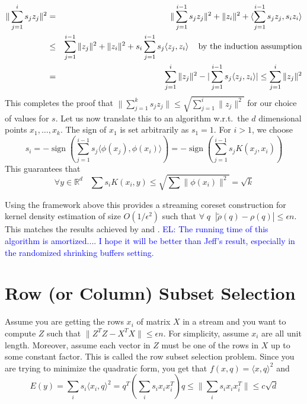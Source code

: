 \documentclass{article} %
\newcommand{\el}[1]{\textcolor{blue}{EL: #1}}
\newcommand{\R}{\mathbb{R}}
\newcommand{\eps}{\epsilon}
\begin{document}
\begin{eqnarray*}
\| \sum_{j=1}^{i}s_j z_j\|^2 &=& \|\sum_{j=1}^{i-1}s_j z_j\|^2 + \|z_i\|^2 + \langle \sum_{j=1}^{i-1}s_j z_j, s_i z_i\rangle \\
&\le& \sum_{j=1}^{i-1} \|z_j\|^2 + \|z_i\|^2 + s_i \sum_{j=1}^{i-1}s_j \langle  z_j,  z_i\rangle \mbox{\;\;\; by the induction assumption}\\ 
&=& \sum_{j=1}^{i} \|z_j\|^2 - |\sum_{j=1}^{i-1}s_j \langle  z_j,  z_i\rangle| \le \sum_{j=1}^{i} \|z_j\|^2
\end{eqnarray*}
This completes the proof that $\| \sum_{j=1}^{k}s_j z_j\| \le \sqrt{\sum_{j=1}^{i} \|z_j\|^2}$ for our choice of values for $s$. 
%
Let us now translate this to an algorithm w.r.t.\ the $d$ dimensional points $x_1,\ldots, x_k$. 
The sign of $x_1$ is set arbitrarily as $s_1=1$. For $i>1$, we choose 
$$ s_i = -\operatorname{sign} (\sum_{j=1}^{i-1}s_j \langle \phi(x_j), \phi(x_i) \rangle) = -\operatorname{sign} (\sum_{j=1}^{i-1}s_j  K(x_j, x_i))$$
This guarantees that 
$$ \forall y \in \R^d \;\;\; \sum s_i K(x_i, y) \leq \sqrt{ \sum \|\phi(x_i)\|^2 } = \sqrt{k} $$

Using the framework above this provides a streaming coreset construction for kernel density estimation of size $O(1/\eps^2)$ such that 
$\forall \;q\;\; |\tilde \rho(q) - \rho(q)| \le \eps n$.
This matches the results achieved by \cite{DBLP:conf/soda/PhillipsT18} and \cite{DBLP:journals/corr/abs-1802-01751}.
\el{The running time of this algorithm is amortized.... I hope it will be better than Jeff's result, especially in the randomized shrinking buffers setting.}








\section{Row (or Column) Subset Selection}
Assume you are getting the rows $x_i$  of matrix $X$ in a stream and you want to compute $Z$ such that $\|Z^TZ - X^TX\| \le \eps n$.
For simplicity, assume $x_i$ are all unit length. Moreover, assume each vector in $Z$ must be one of the rows in $X$ up to some constant factor.
This is called the row subset selection problem. 
Since you are trying to minimize the quadratic form, you get that $f(x, q) = \langle x,q \rangle ^2$ and 
$$E(y) = \sum_i s_i \langle x_i,q \rangle ^2 = q^T (\sum_i s_i x_i x_i^T ) q \le \|\sum_i s_i x_i x_i^T\| \le c\sqrt{d}$$
\end{document}
